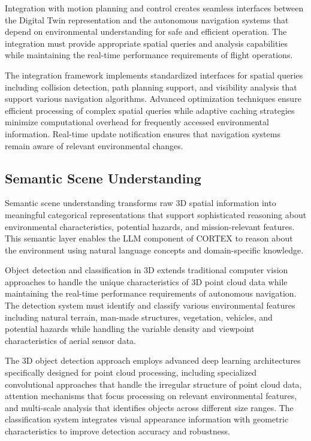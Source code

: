 Integration with motion planning and control creates seamless interfaces between the Digital Twin representation and the autonomous navigation systems that depend on environmental understanding for safe and efficient operation. The integration must provide appropriate spatial queries and analysis capabilities while maintaining the real-time performance requirements of flight operations.

The integration framework implements standardized interfaces for spatial queries including collision detection, path planning support, and visibility analysis that support various navigation algorithms. Advanced optimization techniques ensure efficient processing of complex spatial queries while adaptive caching strategies minimize computational overhead for frequently accessed environmental information. Real-time update notification ensures that navigation systems remain aware of relevant environmental changes.

\subsection{Semantic Scene Understanding}

Semantic scene understanding transforms raw 3D spatial information into meaningful categorical representations that support sophisticated reasoning about environmental characteristics, potential hazards, and mission-relevant features. This semantic layer enables the LLM component of CORTEX to reason about the environment using natural language concepts and domain-specific knowledge.

Object detection and classification in 3D extends traditional computer vision approaches to handle the unique characteristics of 3D point cloud data while maintaining the real-time performance requirements of autonomous navigation. The detection system must identify and classify various environmental features including natural terrain, man-made structures, vegetation, vehicles, and potential hazards while handling the variable density and viewpoint characteristics of aerial sensor data.

The 3D object detection approach employs advanced deep learning architectures specifically designed for point cloud processing, including specialized convolutional approaches that handle the irregular structure of point cloud data, attention mechanisms that focus processing on relevant environmental features, and multi-scale analysis that identifies objects across different size ranges. The classification system integrates visual appearance information with geometric characteristics to improve detection accuracy and robustness.

